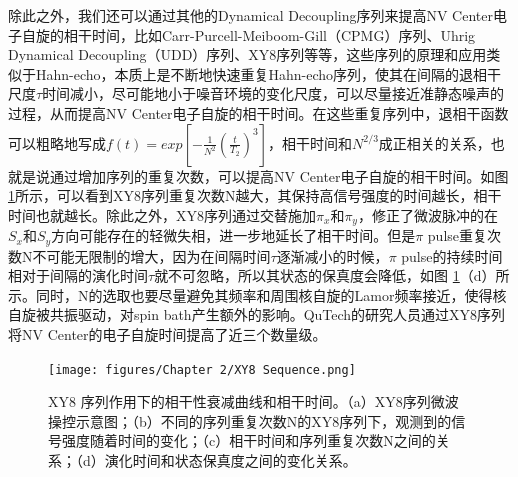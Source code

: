 \documentclass[type = bachelor, oneside]{whu-thesis}
\begin{document}
除此之外，我们还可以通过其他的Dynamical Decoupling序列来提高NV Center电子自旋的相干时间，比如Carr-Purcell-Meiboom-Gill（CPMG）序列、Uhrig Dynamical Decoupling（UDD）序列、XY8序列等等，这些序列的原理和应用类似于Hahn-echo，本质上是不断地快速重复Hahn-echo序列，使其在间隔的退相干尺度$\tau$时间减小，尽可能地小于噪音环境的变化尺度，可以尽量接近准静态噪声的过程，从而提高NV Center电子自旋的相干时间。在这些重复序列中，退相干函数可以粗略地写成$f(t)=exp[-\frac{1}{N^2}(\frac{t}{T_2})^3]$，相干时间和$N^{2/3}$成正相关的关系，也就是说通过增加序列的重复次数，可以提高NV Center电子自旋的相干时间。如图 \ref{fig: XY8 Sequence}所示，可以看到XY8序列重复次数N越大，其保持高信号强度的时间越长，相干时间也就越长。除此之外，XY8序列通过交替施加$\pi_x$和$\pi_y$，修正了微波脉冲的在$S_x$和$S_y$方向可能存在的轻微失相，进一步地延长了相干时间。但是$\pi$ pulse重复次数N不可能无限制的增大，因为在间隔时间$\tau$逐渐减小的时候，$\pi$ pulse的持续时间相对于间隔的演化时间$\tau$就不可忽略，所以其状态的保真度会降低，如图 \ref{fig: XY8 Sequence}（d）所示。同时，N的选取也要尽量避免其频率和周围核自旋的Lamor频率接近，使得核自旋被共振驱动，对spin bath产生额外的影响。QuTech的研究人员通过XY8序列将NV Center的电子自旋时间提高了近三个数量级\cite{Abobeih2018}。
\begin{figure}
  \centering
  \texttt{[image: figures/Chapter 2/XY8 Sequence.png]}
  \caption[XY8 序列作用下的相干性衰减曲线和相干时间]{XY8 序列作用下的相干性衰减曲线和相干时间。（a）XY8序列微波操控示意图；（b）不同的序列重复次数N的XY8序列下，观测到的信号强度随着时间的变化；（c）相干时间和序列重复次数N之间的关系；（d）演化时间和状态保真度之间的变化关系。\cite{Abobeih2018}}
  \label{fig: XY8 Sequence}
\end{figure}
 
\end{document}
